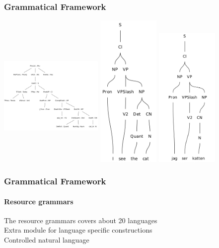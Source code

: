 \documentclass[10pt]{beamer}
\begin{document}
\begin{frame}
  \frametitle{Grammatical Framework}
\includegraphics[width=50mm,height=70mm]{gfTree.png}
\includegraphics[width=30mm]{gfETree.png}
\includegraphics[width=30mm]{gfSTree.png}
 \end{frame}

 \begin{frame}
  \frametitle{Grammatical Framework}
  \framesubtitle{Resource grammars}
  The resource grammars covers about 20 languages \\
  \vspace{5mm}
  \pause
  Extra module for language specific constructions\\
  \vspace{5mm}
  \pause
  Controlled natural language
 \end{frame}
\end{document}
